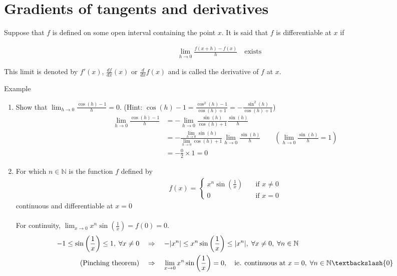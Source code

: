 \documentclass{report}
\begin{document}
	\section{Gradients of tangents and derivatives}

		Suppose that $f$ is defined on some open interval containing the point $x$. It is said that $f$ is differentiable at $x$ if

			\begin{align*}
				\lim_{h\to 0} \frac{f(x + h) - f(x)}{h} \quad \text{exists}
			\end{align*}

		This limit is denoted by $f'(x)$, $\frac{df}{dx} (x)$ or $\frac{d}{dx} f(x)$ and is called the derivative of $f$ at $x$.

		\begin{question}{Example}
			\begin{enumerate}
				\item Show that $\displaystyle\lim_{h\to 0} \frac{\cos(h) - 1}{h} = 0$. \quad (Hint: $\cos(h) - 1 = \frac{\cos^2 (h) - 1}{\cos (h) + 1} = -\frac{\sin^2 (h)}{\cos (h) + 1}$)
					\begin{align*}
						\lim_{h\to 0} \frac{\cos (h) - 1}{h} &= - \lim_{h\to 0} \frac{\sin(h)}{\cos(h) + 1} \frac{\sin(h)}{h}	\\
															 &= - \frac{\displaystyle\lim_{h\to 0} \sin(h)}{\displaystyle\lim_{h\to 0} \cos(h) + 1} \lim_{h\to 0} \frac{\sin(h)}{h} \qquad \left(\lim_{h\to 0} \frac{\sin(h)}{h} = 1\right)	\\
															 &= - \frac{0}{2} \times 1 = 0
					\end{align*}
				\item For which $n \in \mathbb{N}$ is the function $f$ defined by
					\begin{align*}
						f(x) = \begin{cases} x^n \sin\left(\frac{1}{x}\right) \quad & \text{if } x \neq 0	\\	0 & \text{if } x = 0 \end{cases}
					\end{align*}
					continuous and differentiable at $x = 0$
					\\ \\

					For continuity, $\displaystyle\lim_{x\to 0} x^n \sin\left(\frac{1}{x}\right) = f(0) = 0$.
					\begin{alignat*}
						-1 \leq \sin \left(\frac{1}{x}\right) \leq 1, \; \forall x\neq 0 \quad &\Rightarrow \quad -|x^n| \leq x^n \sin \left(\frac{1}{x}\right) \leq |x^n|, \; \forall x \neq 0, \; \forall n \in \mathbb{N}	\\
						\text{(Pinching theorem)} \quad &\Rightarrow \quad \lim_{x\to 0} x^n \sin\left(\frac{1}{x}\right) = 0, \quad \text{ie. continuous at } x=0,\; \forall n \in \mathbb{N} \textbackslash \{0\}
					\end{alignat*}


\end{enumerate}
\end{question}
\end{document}
